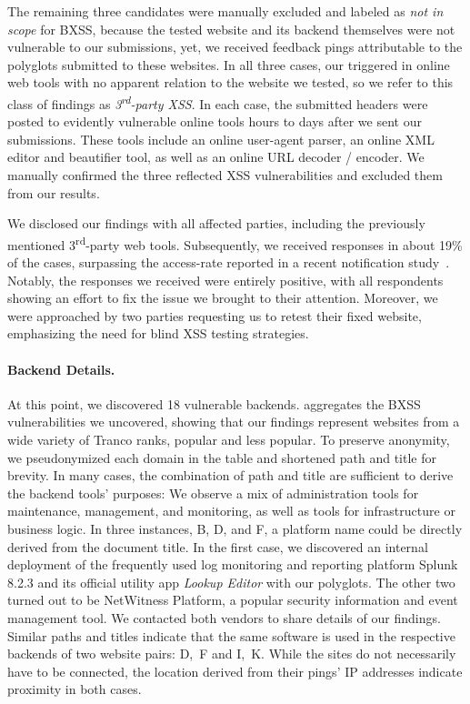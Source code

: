The remaining three candidates were manually excluded and labeled as \emph{not in scope} for BXSS, because the tested website and its backend themselves were not vulnerable to our submissions, yet, we received feedback pings attributable to the polyglots submitted to these websites.
In all three cases, our \ourscriptname{} triggered in online web tools with no apparent relation to the website we tested, so we refer to this class of findings as \emph{3\textsuperscript{rd}-party XSS}.
In each case, the submitted headers were posted to evidently vulnerable online tools hours to days after we sent our submissions.
These tools include an online user-agent parser, an online XML editor and beautifier tool, as well as an online URL decoder / encoder.
We manually confirmed the three reflected XSS vulnerabilities and excluded them from our \blindxss{} results.

We disclosed our findings with all affected parties, including the previously mentioned 3\textsuperscript{rd}-party web tools.
Subsequently, we received responses in about \num{19}\% of the cases, surpassing the access-rate reported in a recent notification study~\cite{stock2018hear}.
Notably, the responses we received were entirely positive, with all respondents showing an effort to fix the issue we brought to their attention.
Moreover, we were approached by two parties requesting us to retest their fixed website, emphasizing the need for blind XSS testing strategies. %

\vspace{-1em}\paragraph{Backend Details.}
At this point, we discovered \num{18} vulnerable backends.
 aggregates the BXSS vulnerabilities we uncovered, showing that our findings represent websites from a wide variety of Tranco ranks, popular and less popular.
To preserve anonymity, we pseudonymized each domain in the table and shortened path and title for brevity.
In many cases, the combination of path and title are sufficient to derive the backend tools' purposes:
We observe a mix of administration tools for maintenance, management, and monitoring, as well as tools for infrastructure or business logic.
In three instances, B, D, and F, a platform name could be directly derived from the document title.
In the first case, we discovered an internal deployment of the frequently used log monitoring and reporting platform Splunk 8.2.3 and its official utility app \emph{Lookup Editor} with our polyglots. %
The other two turned out to be NetWitness Platform, a popular security information and event management tool.
We contacted both vendors to share details of our findings. %
Similar paths and titles indicate that the same software is used in the respective backends of two website pairs: D,~F and I,~K.
While the sites do not necessarily have to be connected, the location derived from their pings' IP addresses indicate proximity in both cases.

